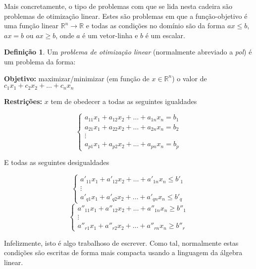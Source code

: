 \documentclass{article}
\newcommand{\R}{\mathbb{R}}
\theoremstyle{definition}
\newtheorem{definition}{Definição}
\begin{document}
	Mais concretamente, o tipo de problemas com que se lida nesta cadeira são problemas de otimização linear. Estes são problemas em que a função-objetivo é uma função linear $\R^n \rightarrow \R$ e todas as condições no domínio são da forma $ax \leq b$, $ax = b$ ou $ax \geq b$, onde $a$ é um vetor-linha e $b$ é um escalar.
	
	\begin{definition}
	Um \emph{problema de otimização linear} (normalmente abreviado a \emph{pol}) é um problema da forma:
	
	\smallskip
	
	\textbf{Objetivo: } maximizar/minimizar (em função de $x \in \R^n$) o valor de ${c_1 x_1 + c_2 x_2 + \ldots + c_n x_n}$
	
	\smallskip
	
	\textbf{Restrições: } $x$ tem de obedecer a todas as seguintes igualdades

\[
\begin{cases}
	a_{11} x_1 + a_{12} x_2 + \ldots + a_{1n} x_n = b_1 \\ 
	a_{21} x_1 + a_{22} x_2 + \ldots + a_{2n} x_n = b_2 \\
	\vdots \\
	a_{p1} x_1 + a_{p2} x_2 + \ldots + a_{pn} x_n = b_p
\end{cases}
\]

E todas as seguintes desigualdades

\[
\begin{cases}
	a'_{11} x_1 + a'_{12} x_2 + \ldots + a'_{1n} x_n \leq b'_1 \\ 
	\vdots \\
	a'_{q1} x_1 + a'_{q2} x_2 + \ldots + a'_{qn} x_n \leq b'_q
\end{cases}
\]
\[
\begin{cases}
	a''_{11} x_1 + a''_{12} x_2 + \ldots + a''_{1n} x_n \geq b''_1 \\ 
	\vdots \\
	a''_{r1} x_1 + a''_{r2} x_2 + \ldots + a''_{rn} x_n \geq b''_r
\end{cases}
\]
	\end{definition}
	
	Infelizmente, isto é algo trabalhoso de escrever. Como tal, normalmente estas condições são escritas de forma mais compacta usando a linguagem da álgebra linear.
	
\end{document}
